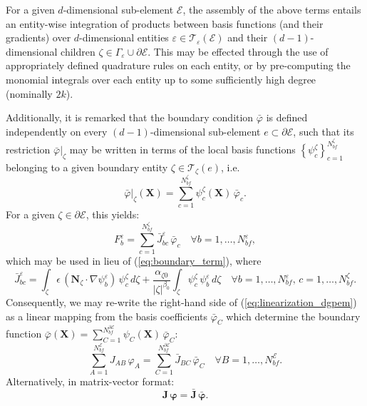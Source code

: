 	For a given $d$-dimensional sub-element $\mathcal{E}$, the assembly of the above terms entails an entity-wise integration of products between basis functions (and their gradients) over $d$-dimensional entities $\varepsilon \in \mathcal{T}_\varepsilon (\mathcal{E})$ and their $(d-1)$-dimensional children $\zeta \in \Gamma_\varepsilon \cup \partial \mathcal{E}$. This may be effected through the use of appropriately defined quadrature rules on each entity, or by pre-computing the monomial integrals over each entity up to some sufficiently high degree (nominally $2k$).
	
	Additionally, it is remarked that the boundary condition $\bar{\varphi}$ is defined independently on every $(d-1)$-dimensional sub-element $e \subset \partial \mathcal{E}$, such that its restriction $\bar{\varphi}|_\zeta$ may be written in terms of the local basis functions $\left\{ \psi^{\zeta}_c \right\}_{c=1}^{N^\zeta_{bf}}$ belonging to a given boundary entity $\zeta \in \mathcal{T}_{\zeta} (e)$, i.e.
	\begin{equation}
			\bar{\varphi}|_\zeta (\mathbf{X}) = \sum_{c=1}^{N^\zeta_{bf}} \psi^\zeta_c (\mathbf{X}) \, \bar{\varphi}_c.
	\end{equation}
	For a given $\zeta \in \partial \mathcal{E}$, this yields:
	\begin{equation}
		F^{\varepsilon}_b = \sum_{c=1}^{N^\zeta_{bf}} \bar{J}^{\varepsilon}_{bc} \, \bar{\varphi}_c \quad \forall b = 1, \ldots, N^{\varepsilon}_{bf},
	\end{equation}
	which may be used in lieu of (\ref{eq:boundary_term}), where
	\begin{equation}
		\bar{J}^{\varepsilon}_{bc} = \int_{\zeta} \epsilon \, (\mathbf{N}_{\zeta} \cdot \nabla \psi_b^{\varepsilon}) \, \psi^\zeta_c  \, d \zeta + \frac{\alpha_{\zeta0}}{|\zeta|^{\beta_0}} \int_{\zeta} \psi^\zeta_c \, \psi_b^{\varepsilon} \, d \zeta \quad \forall b = 1, \ldots, N^{\varepsilon}_{bf}, \, c = 1, \ldots, N^\zeta_{bf}.
	\end{equation}
	Consequently, we may re-write the right-hand side of (\ref{eq:linearization_dgpem}) as a linear mapping from the basis coefficients $\bar{\varphi}_C$ which determine the boundary function $\bar{\varphi} (\mathbf{X}) = \sum_{C=1}^{N^{\partial \mathcal{E}}_{bf}} \psi_C (\mathbf{X}) \, \bar{\varphi}_C$:
	\begin{equation}
		\sum_{A=1}^{N^{\mathcal{E}}_{bf}} J_{AB} \, \varphi_A = \sum_{C=1}^{N^{\partial \mathcal{E}}_{bf}} \bar{J}_{BC} \, \bar{\varphi}_C \quad \forall B = 1, \ldots, N^{\mathcal{E}}_{bf}.
	\end{equation}
	Alternatively, in matrix-vector format:
	\begin{equation}
		\mathbf{J} \, \boldsymbol{\varphi} = \bar{\mathbf{J}} \, \bar{\boldsymbol{\varphi}}.
		\label{eq:dgpem_linear_system}
	\end{equation}
	
